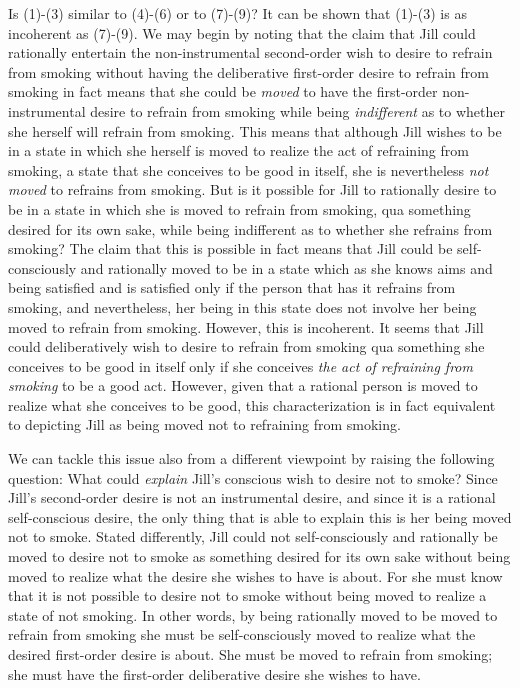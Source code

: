 \documentclass[output=paper,colorlinks,citecolor=brown
]{langscibook}
\begin{document}
Is (1)-(3) similar to (4)-(6) or to (7)-(9)? It can be shown that (1)-(3) is as incoherent as (7)-(9).
We may begin by noting that the claim that Jill could rationally entertain the non-instrumental second-order wish to desire to refrain from smoking without having the deliberative first-order desire to refrain from smoking in fact means that she could be \textit{moved} to have the first-order non-instrumental desire to refrain from smoking while being \textit{indifferent} as to whether she herself will refrain from smoking. This means that although Jill wishes to be in a state in which she herself is moved to realize the act of refraining from smoking, a state that she conceives to be good in itself, she is nevertheless \textit{not moved} to refrains from smoking. But is it possible for Jill to rationally desire to be in a state in which she is moved to refrain from smoking, qua something desired for its own sake, while being indifferent as to whether she refrains from smoking? The claim that this is possible in fact means that Jill could be self-consciously and rationally moved to be in a state which as she knows aims and being satisfied and is satisfied only if the person that has it refrains from smoking, and nevertheless, her being in this state does not involve her being moved to refrain from smoking. However, this is incoherent. It seems that Jill could deliberatively wish to desire to refrain from smoking qua something she conceives to be good in itself only if she conceives \textit{the act of refraining from smoking} to be a good act. However, given that a rational person is moved to realize what she conceives to be good, this characterization is in fact equivalent to depicting Jill as being moved not to refraining from smoking.

We can tackle this issue also from a different viewpoint by raising the following question: What could \textit{explain} Jill’s conscious wish to desire not to smoke? Since Jill’s second-order desire is not an instrumental desire, and since it is a rational self-conscious desire, the only thing that is able to explain this is her being moved not to smoke. Stated differently, Jill could not self-consciously and rationally be moved to desire not to smoke as something desired for its own sake without being moved to realize what the desire she wishes to have is about. For she must know that it is not possible to desire not to smoke without being moved to realize a state of not smoking. In other words, by being rationally moved to be moved to refrain from smoking she must be self-consciously moved to realize what the desired first-order desire is about. She must be moved to refrain from smoking; she must have the first-order deliberative desire she wishes to have.
\end{document}
